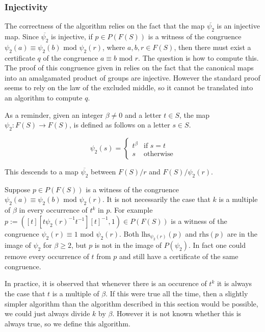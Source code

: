 \documentclass[12pt]{article} %
\theoremstyle{definition}
\theoremstyle{definition}
\theoremstyle{definition}
\theoremstyle{definition}
\theoremstyle{definition}
\theoremstyle{definition}
\begin{document}
\subsubsection{Injectivity}\label{powproofs}

The correctness of the algorithm relies on the fact that the map
$\overline{\psi_2}$ is an injective map.
Since $\overline{\psi_2}$ is injective, if $p \in P(F(S))$ is a witness of the congruence
$\psi_2(a) \equiv \psi_2(b) \text{ mod } \psi_2(r)$, where $a, b, r \in F(S)$,
then there must exist a certificate
$q$ of the congruence $a \equiv b \text{ mod }r$. The question is how to compute this. The proof
of this congruence given in \cite{PutmanOneRelator}
relies on the fact that the canonical maps into an amalgamated product
of groups are injective. However the standard proof
seems to rely on the law of the excluded middle, so
it cannot be translated into an algorithm to compute $q$.

As a reminder, given an integer $\beta \ne 0$ and a letter $t \in S$,
the map $\psi_2 : F(S) \to F(S)$, is defined as follows on a letter $s \in S$.

\begin{equation}
  \psi_2(s) =
  \begin{cases}
     t^\beta & \text{if } s = t \\
     s & \text{otherwise}
  \end{cases}
\end{equation}

This descends to a map $\overline{\psi_2}$ between $F(S) / r$
and $F(S) / \psi_2(r)$.

Suppose $p \in P(F(S))$ is a witness of the congruence
$\psi_2(a) \equiv \psi_2(b) \text{ mod } \psi_2(r)$. It is not necessarily the case that $k$
is a multiple of $\beta$ in every occurrence of $t^k$ in $p$. For example
$p := ([t][t\psi_2(r)^{-1}t^{-1}][t]^{-1}, 1) \in P(F(S))$ is a witness of the congruence
$\psi_2(r) \equiv 1 \text{ mod } \psi_2(r)$. Both $\text{lhs}_{\psi_2(r)}(p)$
and $\text{rhs}(p)$ are in the image of
$\psi_2$ for $\beta \ge 2$,
but $p$ is not in the image of $P(\psi_2)$. In fact
one could remove every occurrence of $t$ from $p$ and still have a certificate of the same
congruence.

In practice, it is observed that whenever there is an occurence of $t^k$ it is always
the case that $t$ is a multiple of $\beta$. If this were true all the time, then a slightly
simpler algorithm than the algorithm described in this section would be possible,
we could just always divide $k$ by $\beta$. However it is not known whether this is always
true, so we define this algorithm.
\end{document}
